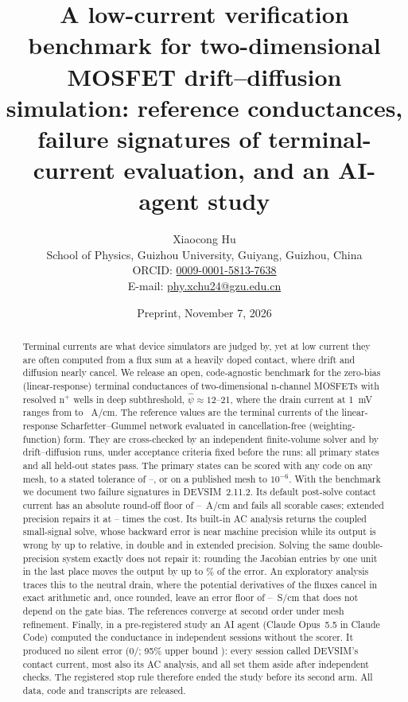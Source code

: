 \documentclass[11pt]{article}
\title{A low-current verification benchmark for two-dimensional MOSFET drift--diffusion simulation:
reference conductances, failure signatures of terminal-current evaluation, and an AI-agent study}
\author{Xiaocong Hu\\[3pt]
\small School of Physics, Guizhou University, Guiyang, Guizhou, China\\
\small ORCID: \href{https://orcid.org/0009-0001-5813-7638}{0009-0001-5813-7638}\\
\small E-mail: \href{mailto:phy.xchu24@gzu.edu.cn}{phy.xchu24@gzu.edu.cn}}
\date{Preprint, November 7, 2026}
\begin{document}
\maketitle

\begin{abstract}
Terminal currents are what device simulators are judged by, yet at low current they are often computed from a
flux sum at a heavily doped contact, where drift and diffusion nearly cancel. We release an open,
code-agnostic benchmark for the zero-bias (linear-response) terminal conductances of two-dimensional n-channel MOSFETs
with resolved n$^+$ wells in deep subthreshold, $\hat\psi \approx 12$--21, where the drain current at 1~mV ranges from
\IoneMin{} to \IoneMax{}~A/cm. The reference values are the terminal currents of the linear-response Scharfetter--Gummel
network evaluated in cancellation-free (weighting-function) form. They are cross-checked by an independent
finite-volume solver and by drift--diffusion runs, under acceptance criteria fixed before the runs: all \HonePass{} primary
states and all \HtwoPass{} held-out states pass. The primary states can be scored with any code on any mesh, to a
stated tolerance of \tolMin{}--\tolMax{}, or on a published mesh to $10^{-6}$. With the benchmark we document two failure signatures in
DEVSIM~2.11.2. Its default post-solve contact current has an absolute round-off floor of \floorMin{}--\floorMax{}~A/cm and
fails all \hthreeAll{} scorable cases; extended precision repairs it at \extCostMin--\extCostMax{} times the cost. Its
built-in AC analysis returns the coupled small-signal solve, whose backward error is near machine precision while its
output is wrong by up to \acMaxExt{} relative, in double and in extended precision. Solving the same double-precision
system exactly does not repair it: rounding the Jacobian entries by one unit in the last place moves the output by up to
\ssSdblMax\% of the error. An exploratory analysis traces this to the neutral drain, where the potential derivatives of
the fluxes cancel in exact arithmetic and, once rounded, leave an error floor of \xsFloorMin{}--\xsFloorMax{}~S/cm that
does not depend on the gate bias.
The references converge at second order under mesh refinement. Finally, in a pre-registered study
an AI agent (Claude Opus~5.5 in Claude Code) computed the conductance in \agentRuns{} independent sessions without the
scorer. It produced no silent error (0/\agentRuns{}; 95\% upper bound \agentSEhi{}): every session called DEVSIM's
contact current, most also its AC analysis, and all set them aside after independent checks. The registered stop rule therefore ended the study before its
second arm. All data, code and transcripts are released.
\end{abstract}
\end{document}
